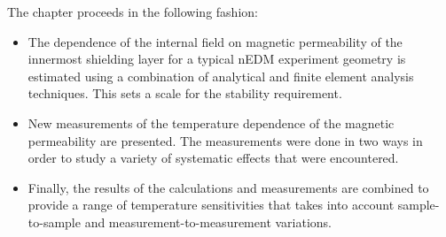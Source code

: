 





The chapter proceeds in the following fashion:
\begin{itemize}
\item The dependence of the internal field on magnetic permeability of
  the innermost shielding layer for a typical nEDM experiment geometry
  is estimated using a combination of analytical and finite element
  analysis techniques.  This sets a scale for the stability
  requirement.
\item New measurements of the temperature dependence of the magnetic
  permeability are presented.  The measurements were done in two ways
  in order to study a variety of systematic effects that were
  encountered.
\item Finally, the results of the calculations and measurements are
  combined to provide a range of temperature sensitivities that takes
  into account sample-to-sample and measurement-to-measurement
  variations.
\end{itemize}

